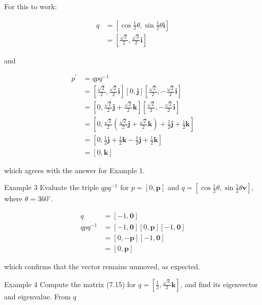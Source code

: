For this to work:

$$
\begin{aligned}
q & =\left[\cos \frac{1}{2} \theta, \sin \frac{1}{2} \theta \mathbf{i}\right] \\
& =\left[\frac{\sqrt{2}}{2}, \frac{\sqrt{2}}{2} \mathbf{i}\right]
\end{aligned}
$$

and

$$
\begin{aligned}
p^{\prime} & =q p q^{-1} \\
& =\left[\frac{\sqrt{2}}{2}, \frac{\sqrt{2}}{2} \mathbf{i}\right][0, \mathbf{j}]\left[\frac{\sqrt{2}}{2},-\frac{\sqrt{2}}{2} \mathbf{i}\right] \\
& =\left[0, \frac{\sqrt{2}}{2} \mathbf{j}+\frac{\sqrt{2}}{2} \mathbf{k}\right]\left[\frac{\sqrt{2}}{2},-\frac{\sqrt{2}}{2} \mathbf{i}\right] \\
& =\left[0, \frac{\sqrt{2}}{2}\left(\frac{\sqrt{2}}{2} \mathbf{j}+\frac{\sqrt{2}}{2} \mathbf{k}\right)+\frac{1}{2} \mathbf{j}+\frac{1}{2} \mathbf{k}\right] \\
& =\left[0, \frac{1}{2} \mathbf{j}+\frac{1}{2} \mathbf{k}-\frac{1}{2} \mathbf{j}+\frac{1}{2} \mathbf{k}\right] \\
& =[0, \mathbf{k}]
\end{aligned}
$$

which agrees with the answer for Example 1.

Example 3 Evaluate the triple $q p q^{-1}$ for $p=[0, \mathbf{p}]$ and $q=\left[\cos \frac{1}{2} \theta, \sin \frac{1}{2} \theta \mathbf{v}\right]$, where $\theta=360^{\circ}$.

$$
\begin{aligned}
q & =[-1, \mathbf{0}] \\
q p q^{-1} & =[-1, \mathbf{0}][0, \mathbf{p}][-1, \mathbf{0}] \\
& =[0,-\mathbf{p}][-1, \mathbf{0}] \\
& =[0, \mathbf{p}]
\end{aligned}
$$

which confirms that the vector remains unmoved, as expected.

Example 4 Compute the matrix (7.15) for $q=\left[\frac{1}{2}, \frac{\sqrt{3}}{2} \mathbf{k}\right]$, and find its eigenvector and eigenvalue. From $q$

